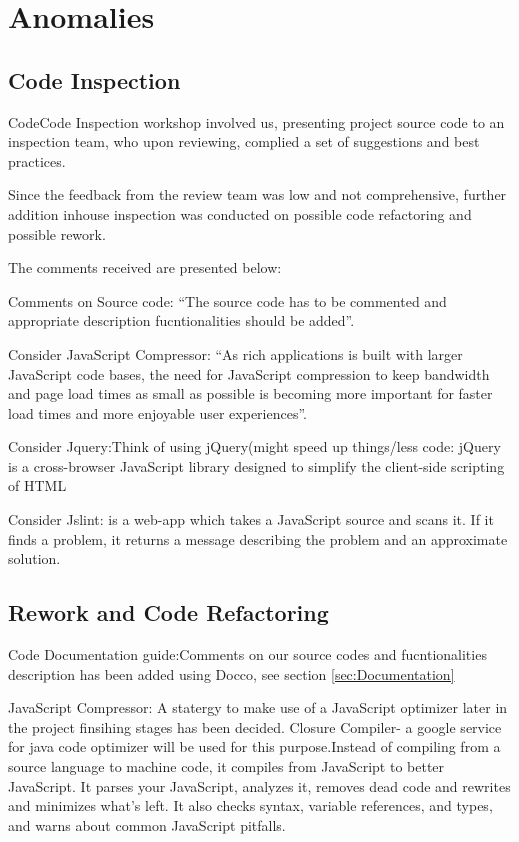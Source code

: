 \section{Anomalies} %
\label{sec:Anomalies}

\subsection{Code Inspection} %
\label{sub:Code Inspection}



CodeCode Inspection workshop involved us, presenting project source code to an inspection team,
who upon reviewing, complied a set of suggestions and best practices.

Since the feedback from the review team was low and not comprehensive, further addition inhouse inspection was conducted on possible 
code refactoring and possible rework.

The comments received are presented below:

Comments on Source code: ``The source code has to be commented and appropriate description fucntionalities should be added''.

Consider JavaScript Compressor: ``As rich applications is built with larger JavaScript code bases, the need for JavaScript compression 
to keep bandwidth and page load times as small as possible is becoming more important for faster load times and more enjoyable user experiences''.

Consider Jquery:Think of using jQuery(might speed up things/less code: jQuery is a cross-browser JavaScript library designed to simplify the client-side scripting of HTML
 
Consider Jslint: is a web-app which takes a JavaScript source and scans it. If it finds a problem, it returns a message describing the problem and an approximate solution. 

\subsection{Rework and Code Refactoring} %
\label{sub:rework}


Code Documentation guide:Comments on our source codes and fucntionalities description has been added using Docco, see section \ref{sec:Documentation}

JavaScript Compressor: A statergy to make use of a JavaScript optimizer later in the project finsihing stages has been decided.
Closure Compiler- a google service for java code optimizer will be used for this purpose.Instead of compiling from a source language to machine code, it compiles from JavaScript to better JavaScript. It parses your JavaScript, analyzes it, removes dead code and rewrites and minimizes what's left. 
It also checks syntax, variable references, and types, and warns about common JavaScript pitfalls. 

